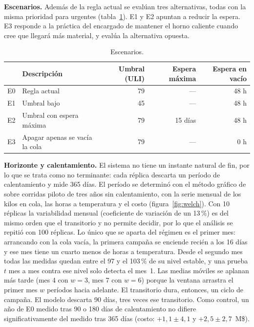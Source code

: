 \documentclass[a4paper,11pt]{article}
\begin{document}
\textbf{Escenarios.} Además de la regla actual se evalúan tres alternativas, todas con la misma prioridad para
urgentes (tabla~\ref{tab:escenarios}). E1 y E2 apuntan a reducir la espera. E3 responde a la práctica del
encargado de mantener el horno caliente cuando cree que llegará más material, y evalúa la alternativa opuesta.

\begin{table}[H]
\centering\small
\caption{Escenarios.}
\label{tab:escenarios}
\begin{tabular}{@{}llrrr@{}}
\toprule
& Descripción & Umbral (ULI) & Espera máxima & Espera en vacío \\
\midrule
E0 & Regla actual & 79 & --- & 48 h \\
E1 & Umbral bajo & 45 & --- & 48 h \\
E2 & Umbral con espera máxima & 79 & 15 días & 48 h \\
E3 & Apagar apenas se vacía la cola & 79 & --- & 0 h \\
\bottomrule
\end{tabular}
\end{table}

\textbf{Horizonte y calentamiento.} El sistema no tiene un instante natural de fin, por lo que se trata como no
terminante: cada réplica descarta un período de calentamiento y mide 365 días. El período se determinó con el
método gráfico de \citet{welch1983} \citep[cap.~9]{law2015} sobre corridas piloto de tres años sin
calentamiento, con la serie mensual de los kilos en cola, las horas a temperatura y el costo
(figura~\ref{fig:welch}). Con 10 réplicas la variabilidad mensual (coeficiente de variación de un 13\,\%) es del
mismo orden que el transitorio y no permite decidir, por lo que el análisis se repitió con 100 réplicas. Lo
único que se aparta del régimen es el primer mes: arrancando con la cola vacía, la primera campaña se enciende
recién a los 16 días y ese mes tiene un cuarto menos de horas a temperatura. Desde el segundo mes todas las
medidas quedan entre el 97 y el 103\,\% de su nivel estable, y una prueba $t$ mes a mes contra ese nivel solo
detecta el mes~1. Las medias móviles se aplanan más tarde (mes 4 con $w = 3$, mes 7 con $w = 6$) porque la
ventana arrastra el primer mes $w$ períodos hacia adelante. El transitorio dura, entonces, un ciclo de campaña.
El modelo descarta 90 días, tres veces ese transitorio. Como control, un año de E0 medido tras 90 o 180 días de calentamiento
no difiere significativamente del medido tras 365 días (costo: $+1{,}1 \pm 4{,}1$ y $+2{,}5 \pm 2{,}7$~M\$).
\end{document}
